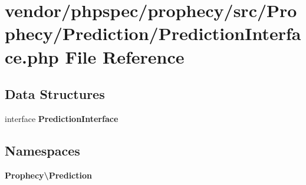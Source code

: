 \section{vendor/phpspec/prophecy/src/\+Prophecy/\+Prediction/\+Prediction\+Interface.php File Reference}
\label{_prediction_interface_8php}
\subsection*{Data Structures}
\begin{DoxyCompactItemize}
\item 
interface {\bf Prediction\+Interface}
\end{DoxyCompactItemize}
\subsection*{Namespaces}
\begin{DoxyCompactItemize}
\item 
 {\bf Prophecy\textbackslash{}\+Prediction}
\end{DoxyCompactItemize}
